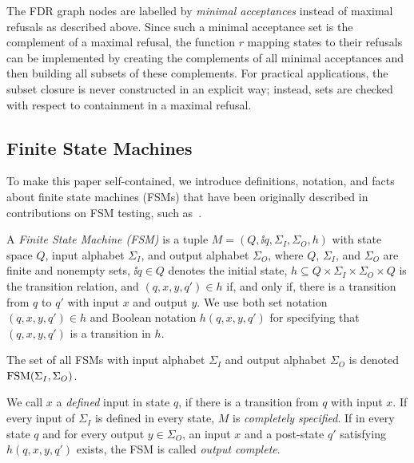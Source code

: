 The FDR graph nodes are labelled by \emph{minimal acceptances} instead of
maximal refusals as described above. Since such a minimal acceptance set is
the complement of a maximal refusal, the function $r$ mapping states to their
refusals can be implemented by creating the complements of all minimal
acceptances and then building all subsets of these complements. For practical
applications, the subset closure is never constructed in an explicit way;
instead, sets are checked with respect to containment in a maximal refusal.

%

\subsection{Finite State Machines}

To make this paper self-contained, we introduce definitions, notation, and
facts about finite state machines (FSMs) that have been originally described
in contributions on FSM testing, such
as~\cite{petrenko_testing_2011,DBLP:conf/hase/PetrenkoY14,hierons_testing_2004}.

A \emph{Finite State Machine (FSM)} is  a tuple $M=(Q, \ii{q}, \Sigma_I,
\Sigma_O,  h)$   with state space $Q$, input alphabet $\Sigma_I$, and output
alphabet $\Sigma_O$, where $Q$, $\Sigma_I$, and $\Sigma_O$ are finite and
nonempty sets, $\ii{q}\in Q$ denotes the initial state, $h\subseteq Q\times
\Sigma_I \times \Sigma_O\times Q$ is the transition relation, and
$(q,x,y,q')\in h$ if, and only if, there is a transition from $q$ to $q'$
with input $x$ and output $y$. We use  both set notation $(q,x,y,q')\in h$
and Boolean notation $h(q,x,y,q')$ for specifying that $(q,x,y,q')$ is a
transition in $h$.

The set of all FSMs with input alphabet $\Sigma_I$ and output alphabet
$\Sigma_O$ is denoted $\text{FSM}(\Sigma_I,\Sigma_O)$.

We call $x$ a \emph{defined} input in state $q$, if there is a transition
from $q$  with input $x$. If every input of $\Sigma_I$ is defined in every
state, $M$ is \emph{completely specified}. If in every state $q$ and for
every output $y\in\Sigma_O$, an input $x$ and a post-state $q'$ satisfying
$h(q,x,y,q')$ exists, the FSM is called \emph{output complete}.

